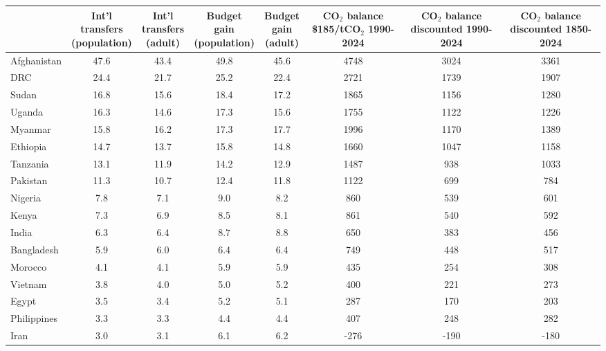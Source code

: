 
\begin{tabular}[t]{lccccccc}
\toprule
  & \makecell{Int'l\\transfers\\(population)} & \makecell{Int'l\\transfers\\(adult)} & \makecell{Budget\\gain\\(population)} & \makecell{Budget\\gain\\(adult)} & \makecell{CO$_\text{2}$ balance\\\$185/tCO$_\text{2}$\\1990-2024} & \makecell{CO$_\text{2}$ balance\\discounted\\1990-2024} & \makecell{CO$_\text{2}$ balance\\discounted\\1850-2024}\\
\midrule
Afghanistan & 47.6 & 43.4 & 49.8 & 45.6 & 4748 & 3024 & 3361\\
DRC & 24.4 & 21.7 & 25.2 & 22.4 & 2721 & 1739 & 1907\\
Sudan & 16.8 & 15.6 & 18.4 & 17.2 & 1865 & 1156 & 1280\\
Uganda & 16.3 & 14.6 & 17.3 & 15.6 & 1755 & 1122 & 1226\\
Myanmar & 15.8 & 16.2 & 17.3 & 17.7 & 1996 & 1170 & 1389\\
Ethiopia & 14.7 & 13.7 & 15.8 & 14.8 & 1660 & 1047 & 1158\\
Tanzania & 13.1 & 11.9 & 14.2 & 12.9 & 1487 & 938 & 1033\\
Pakistan & 11.3 & 10.7 & 12.4 & 11.8 & 1122 & 699 & 784\\
Nigeria & 7.8 & 7.1 & 9.0 & 8.2 & 860 & 539 & 601\\
Kenya & 7.3 & 6.9 & 8.5 & 8.1 & 861 & 540 & 592\\
India & 6.3 & 6.4 & 8.7 & 8.8 & 650 & 383 & 456\\
Bangladesh & 5.9 & 6.0 & 6.4 & 6.4 & 749 & 448 & 517\\
Morocco & 4.1 & 4.1 & 5.9 & 5.9 & 435 & 254 & 308\\
Vietnam & 3.8 & 4.0 & 5.0 & 5.2 & 400 & 221 & 273\\
Egypt & 3.5 & 3.4 & 5.2 & 5.1 & 287 & 170 & 203\\
Philippines & 3.3 & 3.3 & 4.4 & 4.4 & 407 & 248 & 282\\
Iran & 3.0 & 3.1 & 6.1 & 6.2 & -276 & -190 & -180\\

\end{tabular}

